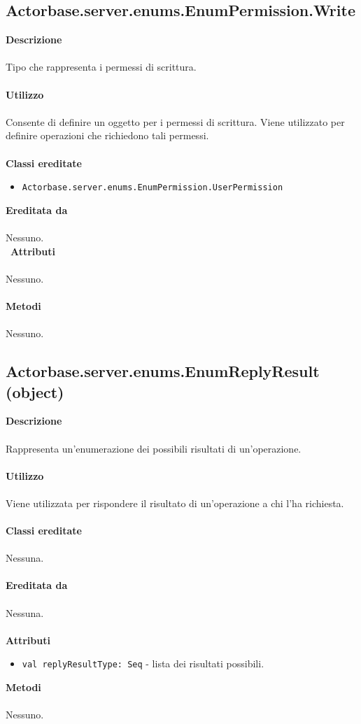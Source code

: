 \documentclass[a4paper]{article}
\begin{document}
	\subsection{Actorbase.server.enums.EnumPermission.Write}
		\textbf{Descrizione}
			\\ \\
				Tipo che rappresenta i permessi di scrittura.
			\\ \\
		\textbf{Utilizzo}
			\\ \\
			Consente di definire un oggetto per i permessi di scrittura. Viene utilizzato per definire operazioni che richiedono tali permessi.
			\\ \\
		\textbf{Classi ereditate}
			\begin{itemize}
				\item \texttt{Actorbase.server.enums.EnumPermission.UserPermission}
			\end{itemize}
		\textbf{Ereditata da}
		\\ \\
		Nessuno.
		\\ \
		\textbf{Attributi}
		\\ \\
			Nessuno.
		\\ \\
		\textbf{Metodi}
			\\ \\
			Nessuno.
			
			\subsection{Actorbase.server.enums.EnumReplyResult (object)}
		\textbf{Descrizione}
			\\ \\
			Rappresenta un'enumerazione dei possibili risultati di un'operazione.
			\\ \\
		\textbf{Utilizzo}
			\\ \\
			Viene utilizzata per rispondere il risultato di un'operazione a chi l'ha richiesta.
			\\ \\
		\textbf{Classi ereditate}
		\\ \\
			Nessuna.
		\\ \\
		\textbf{Ereditata da}
		\\ \\
			Nessuna.
		\\ \\
		\textbf{Attributi}
			\begin{itemize}
				\item \texttt{val replyResultType: Seq} - lista dei risultati possibili.
			\end{itemize}
		\textbf{Metodi}
			\\ \\
			Nessuno.
		
\end{document}
